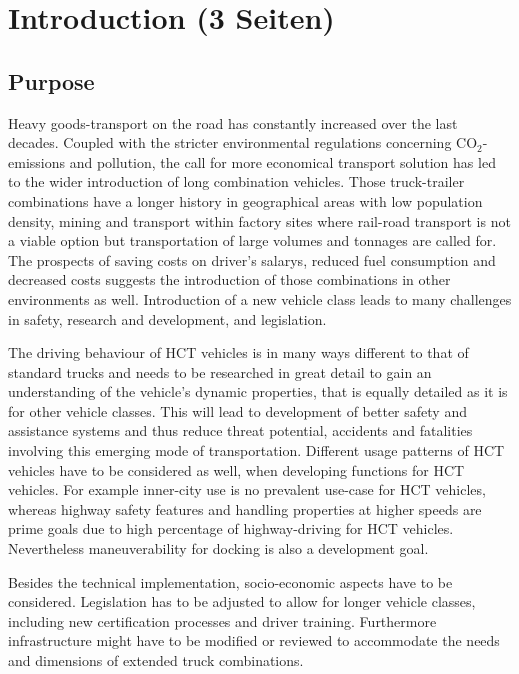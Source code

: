 \documentclass[ExampleMasters.tex]{subfiles}
\begin{document}
\clearpage	
\chapter{Introduction (3 Seiten)}
\label{chap:introduction}

\section{Purpose}
\label{sec:purpose}
Heavy goods-transport on the road has constantly increased over the last decades. Coupled with the stricter environmental regulations concerning CO$_{2}$-emissions and pollution, the call for more economical transport solution has led to the wider introduction of long combination vehicles. Those truck-trailer combinations have a longer history in geographical areas with low population density, mining and transport within factory sites where rail-road transport is not a viable option but transportation of large volumes and tonnages are called for. The prospects of saving costs on driver's salarys, reduced fuel consumption and decreased costs suggests the introduction of those combinations in other environments as well. Introduction of a new vehicle class leads to many challenges in safety, research and development, and legislation. 

The driving behaviour of HCT vehicles is in many ways different to that of standard trucks and needs to be researched in great detail to gain an understanding of the vehicle's dynamic properties, that is equally detailed as it is for other vehicle classes. This will lead to development of better safety and assistance systems and thus reduce threat potential, accidents and fatalities involving this emerging mode of transportation. Different usage patterns of HCT vehicles have to be considered as well, when developing functions for HCT vehicles. For example inner-city use is no prevalent use-case for HCT vehicles, whereas highway safety features and handling properties at higher speeds are prime goals due to high percentage of highway-driving for HCT vehicles. Nevertheless maneuverability for docking is also a development goal.

Besides the technical implementation, socio-economic aspects have to be considered. Legislation has to be adjusted to allow for longer vehicle classes, including new certification processes and driver training. Furthermore infrastructure might have to be modified or reviewed to accommodate the needs and dimensions of extended truck combinations.
\end{document}
